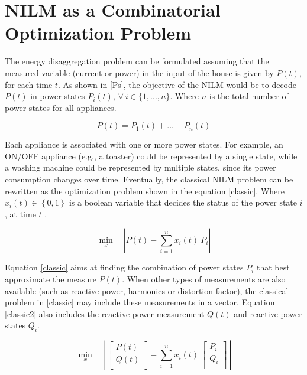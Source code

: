\fi
\section{NILM as a Combinatorial Optimization Problem}

The energy disaggregation problem can be formulated assuming that the measured variable (current or power) in the input of the house is given by $P(t)$, for each time $t$. As shown in \eqref{Ps}, the objective of the NILM would be to decode $P(t)$ in power states $P_i(t)$, $\forall \ i \in \{1,...,n\}$. Where $n$ is the total number of power states for all appliances. 

\begin{equation} \label{Ps}
    P(t) = P_1(t) + ... + P_n(t)
\end{equation}
 
Each appliance is associated with one or more power states. For example, an ON/OFF appliance (e.g., a toaster) could be represented by a single state, while a washing machine could be represented by multiple states, since its power consumption changes over time. 
Eventually, the classical NILM problem can be rewritten as the optimization problem shown in the equation \eqref{classic}. Where $x_i(t) \in \left\{ 0 , 1 \right\}$ is a boolean variable that decides the status of the power state $i$, at time $t$ \cite{hart}.

\begin{equation} \label{classic}
    \min_{x} \quad \left| P(t) - \sum_{i=1}^{n} x_i(t)\ P_i \right |
\end{equation}

Equation \eqref{classic} aims at finding the combination of power states $P_i$ that best approximate the measure $P(t)$. When other types of measurements are also available (such as reactive power, harmonics or distortion factor), the classical problem in \eqref{classic} may include these measurements in a vector. Equation \eqref{classic2} also includes the reactive power measurement $Q(t)$ and reactive power states $Q_i$. 

\begin{equation} \label{classic2}
    \min_{x} \quad \left|\ \begin{bmatrix}
         P(t) \\
         Q(t) \\
        \end{bmatrix} - \sum_{i=1}^{n} x_i(t)\ \begin{bmatrix}
         P_i \\
         Q_i \\
        \end{bmatrix} \ \right|
\end{equation}


